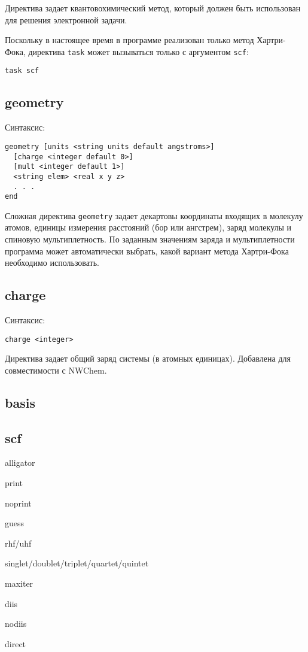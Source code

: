 \documentclass[a4paper, 12pt]{article}
\begin{document}
Директива задает квантовохимический метод, который должен быть использован для решения электронной задачи.

Поскольку в настоящее время в программе реализован только метод Хартри-Фока, директива \texttt{task} может вызываться только с аргументом \texttt{scf}:
\begin{lstlisting}
task scf
\end{lstlisting}

\subsection{geometry}

Синтаксис:

\begin{lstlisting}
geometry [units <string units default angstroms>]
  [charge <integer default 0>]
  [mult <integer default 1>]
  <string elem> <real x y z>
  . . .
end
\end{lstlisting}

Сложная директива \texttt{geometry} задает декартовы координаты входящих в молекулу атомов, единицы измерения расстояний (бор или ангстрем), заряд молекулы и спиновую мультиплетность. По заданным значениям заряда и мультиплетности программа может автоматически выбрать, какой вариант метода Хартри-Фока необходимо использовать.

\subsection{charge}
Синтаксис:

\begin{lstlisting}
charge <integer>
\end{lstlisting}

Директива задает общий заряд системы (в атомных единицах). Добавлена для совместимости с NWChem.

\subsection{basis}
\subsection{scf}
\begin{labeling}{alligator}
\item [print]
\item [noprint]
\item [guess]
\item [rhf/uhf]
\item [singlet/doublet/triplet/quartet/quintet]
\item [maxiter]
\item [diis]
\item [nodiis]
\item [direct]
\end{labeling}
\end{document}
